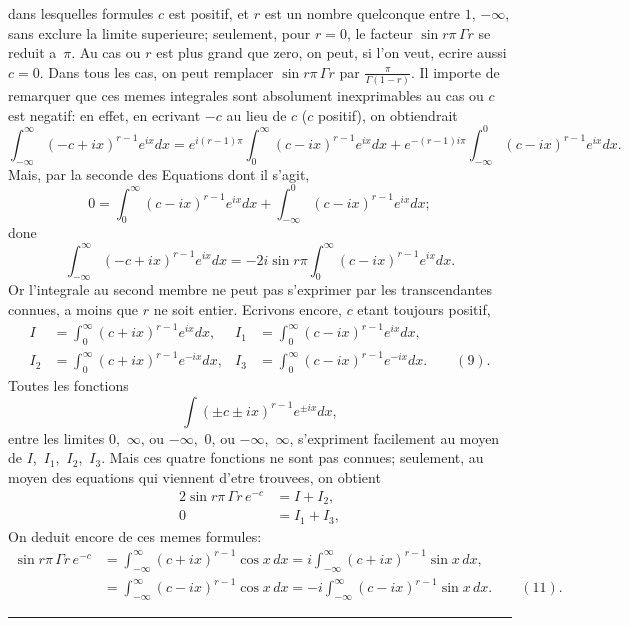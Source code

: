 \documentclass[11pt,a4paper]{book}
\begin{document}
\newpage
dans lesquelles formules $c$ est positif, et $r$ est un nombre quelconque entre $1$, $-\infty$, sans exclure la limite superieure; seulement, pour $r=0$, le facteur $\sin r\pi \, \Gamma r$ se reduit a~$\pi$. Au cas ou $r$ est plus grand que zero, on peut, si l'on veut, ecrire aussi $c=0$. Dans tous les cas, on peut remplacer $\sin r\pi \, \Gamma r$ par $\frac{\pi}{\Gamma(1-r)}$. Il importe de remarquer que ces memes integrales sont absolument inexprimables au cas ou $c$ est negatif: en effet, en ecrivant $-c$ au lieu de $c$ ($c$ positif), on obtiendrait
\[
\int_{-\infty}^{\infty} (-c+ix)^{r-1} e^{ix} dx = e^{i(r-1)\pi} \int_0^{\infty} (c-ix)^{r-1} e^{ix} dx + e^{-(r-1)i\pi} \int_{-\infty}^{0} (c-ix)^{r-1} e^{ix} dx.
\]
Mais, par la seconde des Equations dont il s'agit,
\[
0 = \int_0^{\infty} (c-ix)^{r-1} e^{ix} dx + \int_{-\infty}^{0} (c-ix)^{r-1} e^{ix} dx;
\]
done
\[
\int_{-\infty}^{\infty} (-c+ix)^{r-1} e^{ix} dx = -2i\sin r\pi \int_0^{\infty} (c-ix)^{r-1} e^{ix} dx.
\]
Or l'integrale au second membre ne peut pas s'exprimer par les transcendantes connues, a moins que $r$ ne soit entier. Ecrivons encore, $c$ etant toujours positif,
\begin{align*}
I &= \int_0^{\infty} (c+ix)^{r-1} e^{ix} dx, &
I_1 &= \int_0^{\infty} (c-ix)^{r-1} e^{ix} dx,\\
I_2 &= \int_0^{\infty} (c+ix)^{r-1} e^{-ix} dx, &
I_3 &= \int_0^{\infty} (c-ix)^{r-1} e^{-ix} dx. \qquad(9).
\end{align*}
Toutes les fonctions
\[
\int (\pm c \pm ix)^{r-1} e^{\pm ix} dx,
\]
entre les limites $0$,~$\infty$, ou $-\infty$,~$0$, ou $-\infty$,~$\infty$, s'expriment facilement au moyen de $I$,~$I_1$,~$I_2$,~$I_3$. Mais ces quatre fonctions ne sont pas connues; seulement, au moyen des equations qui viennent d'etre trouvees, on obtient
\begin{align*}
2\sin r\pi \, \Gamma r \, e^{-c} &= I + I_2,\\
0 &= I_1 + I_3,
\end{align*}
On deduit encore de ces memes formules:
\begin{align*}
\sin r\pi \, \Gamma r \, e^{-c} &= \int_{-\infty}^{\infty} (c+ix)^{r-1} \cos x\, dx = i\int_{-\infty}^{\infty} (c+ix)^{r-1} \sin x\, dx,\\
&= \int_{-\infty}^{\infty} (c-ix)^{r-1} \cos x\, dx = -i\int_{-\infty}^{\infty} (c-ix)^{r-1} \sin x\, dx. \qquad(11).
\end{align*}

\vspace{20pt}
\begin{center}
\rule{0.5\textwidth}{0.4pt}
\end{center}
\clearpage
\end{document}
